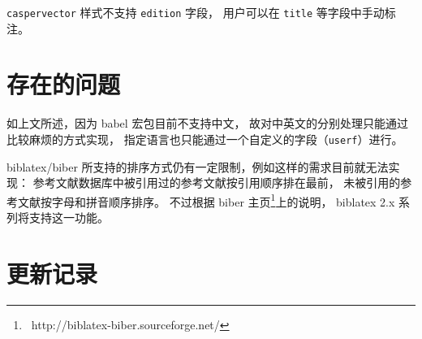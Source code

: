 \documentclass[UTF8, fancyhdr, hyperref]{ctexart}
\begin{document}
\verb|caspervector| 样式不支持 \verb|edition| 字段，
用户可以在 \verb|title| 等字段中手动标注。

\section{存在的问题}

如上文所述，因为 babel 宏包目前不支持中文，
故对中英文的分别处理只能通过比较麻烦的方式实现，
指定语言也只能通过一个自定义的字段（\verb|userf|）进行。

biblatex/biber 所支持的排序方式仍有一定限制，例如这样的需求目前就无法实现：
参考文献数据库中被引用过的参考文献按引用顺序排在最前，
未被引用的参考文献按字母和拼音顺序排序。
不过根据 biber 主页\footnote{\ http://biblatex-biber.sourceforge.net/}上的说明，%
biblatex 2.x 系列将支持这一功能。

\section{更新记录}
\begingroup
\linespread{1}\selectfont
{}
\endgroup

\printbibliography%
	[heading = bibnumbered, title = {本文参考文献}, category = cited]
\printbibliography[
	heading = bibnumbered, notcategory = cited,
	title = {%
		其它参考文献示例
		（引自\texorpdfstring{文献 \parencite{gbt7714-2005}}{ GB/T 7714-2005}）
	}
]
\end{document}
